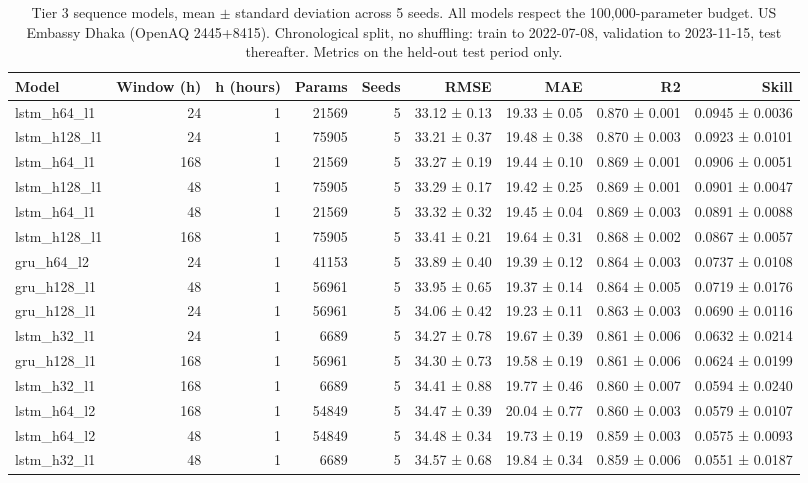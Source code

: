 \begin{table}[htbp]
\caption{Tier 3 sequence models, mean $\pm$ standard deviation across 5 seeds. All models respect the 100,000-parameter budget. US Embassy Dhaka (OpenAQ 2445+8415). Chronological split, no shuffling: train to 2022-07-08, validation to 2023-11-15, test thereafter. Metrics on the held-out test period only.}
\label{tab:tier3_sequence}
\begin{tabular}{lrrrrrrrr}
\toprule
Model & Window (h) & h (hours) & Params & Seeds & RMSE & MAE & R2 & Skill \\
\midrule
lstm\_h64\_l1 & 24 & 1 & 21569 & 5 & 33.12 ± 0.13 & 19.33 ± 0.05 & 0.870 ± 0.001 & 0.0945 ± 0.0036 \\
lstm\_h128\_l1 & 24 & 1 & 75905 & 5 & 33.21 ± 0.37 & 19.48 ± 0.38 & 0.870 ± 0.003 & 0.0923 ± 0.0101 \\
lstm\_h64\_l1 & 168 & 1 & 21569 & 5 & 33.27 ± 0.19 & 19.44 ± 0.10 & 0.869 ± 0.001 & 0.0906 ± 0.0051 \\
lstm\_h128\_l1 & 48 & 1 & 75905 & 5 & 33.29 ± 0.17 & 19.42 ± 0.25 & 0.869 ± 0.001 & 0.0901 ± 0.0047 \\
lstm\_h64\_l1 & 48 & 1 & 21569 & 5 & 33.32 ± 0.32 & 19.45 ± 0.04 & 0.869 ± 0.003 & 0.0891 ± 0.0088 \\
lstm\_h128\_l1 & 168 & 1 & 75905 & 5 & 33.41 ± 0.21 & 19.64 ± 0.31 & 0.868 ± 0.002 & 0.0867 ± 0.0057 \\
gru\_h64\_l2 & 24 & 1 & 41153 & 5 & 33.89 ± 0.40 & 19.39 ± 0.12 & 0.864 ± 0.003 & 0.0737 ± 0.0108 \\
gru\_h128\_l1 & 48 & 1 & 56961 & 5 & 33.95 ± 0.65 & 19.37 ± 0.14 & 0.864 ± 0.005 & 0.0719 ± 0.0176 \\
gru\_h128\_l1 & 24 & 1 & 56961 & 5 & 34.06 ± 0.42 & 19.23 ± 0.11 & 0.863 ± 0.003 & 0.0690 ± 0.0116 \\
lstm\_h32\_l1 & 24 & 1 & 6689 & 5 & 34.27 ± 0.78 & 19.67 ± 0.39 & 0.861 ± 0.006 & 0.0632 ± 0.0214 \\
gru\_h128\_l1 & 168 & 1 & 56961 & 5 & 34.30 ± 0.73 & 19.58 ± 0.19 & 0.861 ± 0.006 & 0.0624 ± 0.0199 \\
lstm\_h32\_l1 & 168 & 1 & 6689 & 5 & 34.41 ± 0.88 & 19.77 ± 0.46 & 0.860 ± 0.007 & 0.0594 ± 0.0240 \\
lstm\_h64\_l2 & 168 & 1 & 54849 & 5 & 34.47 ± 0.39 & 20.04 ± 0.77 & 0.860 ± 0.003 & 0.0579 ± 0.0107 \\
lstm\_h64\_l2 & 48 & 1 & 54849 & 5 & 34.48 ± 0.34 & 19.73 ± 0.19 & 0.859 ± 0.003 & 0.0575 ± 0.0093 \\
lstm\_h32\_l1 & 48 & 1 & 6689 & 5 & 34.57 ± 0.68 & 19.84 ± 0.34 & 0.859 ± 0.006 & 0.0551 ± 0.0187 \\

\end{tabular}
\end{table}
